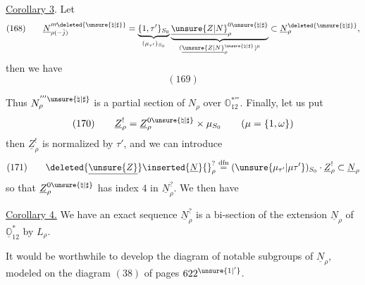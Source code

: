 \uline{Corollary 3}. Let
\[
(168)\qquad
\underline N_{\rho(-\bar j)}^{\prime\prime\prime\deleted{\unsure{\natural|\sharp}}}
=\underbrace{\{1,\tau'\}_{S_0}}_{(\mu_{\tau'})_{S_0}}
\underbrace{\underline{\unsure{Z|N}}_\rho^{0\unsure{\natural|\sharp}}}_{(\underline{\unsure{Z|N}}_\rho^{\unsure{\natural|\sharp}})^0}
\subset\underline N_\rho^{\deleted{\unsure{\natural|\sharp}}},
\]
then we have
\[
(169)
\]


Thus \(N_\rho^{'''\unsure{\natural|\sharp}}\) is a partial section of \(N_\rho\)
over \(\mathbb O_{12}^{*'''}\). Finally, let us put
\[
(170)\qquad
\underline Z_\rho^{!}
=\underline Z_\rho^{0\unsure{\natural|\sharp}}\times\mu_{S_0}
\qquad(\mu=\{1,\omega\})
\]
then \(\underline Z_\rho^!\) is normalized by \(\tau'\), and
we can introduce
\[
(171)\qquad
\deleted{\underline{\unsure{Z}}}\inserted{\underline N}{}_\rho^{?}
\mathrel{\overset{\mathrm{dfn}}{=}}
(\unsure{\mu_{\tau'}|\mu\tau'})_{S_0}\cdot\underline Z_\rho^!
\subset\underline N_\rho
\]
so that \(\underline Z_\rho^{0\unsure{\natural|\sharp}}\) has index \(4\)
in \(\underline N_\rho^{?}\). We then have

\uline{Corollary 4.} We have an exact sequence
\(\underline N_\rho^{?}\) is a bi-section of the extension
\(\underline N_\rho\) of \(\underline{\mathbb O}_{12}^{*}\) by \(L_\rho\).

It would be worthwhile to develop the diagram of notable
subgroups of \(\underline N_\rho\), modeled on
the diagram \((38)\) of pages \(622^{\unsure{1|'}}\).

